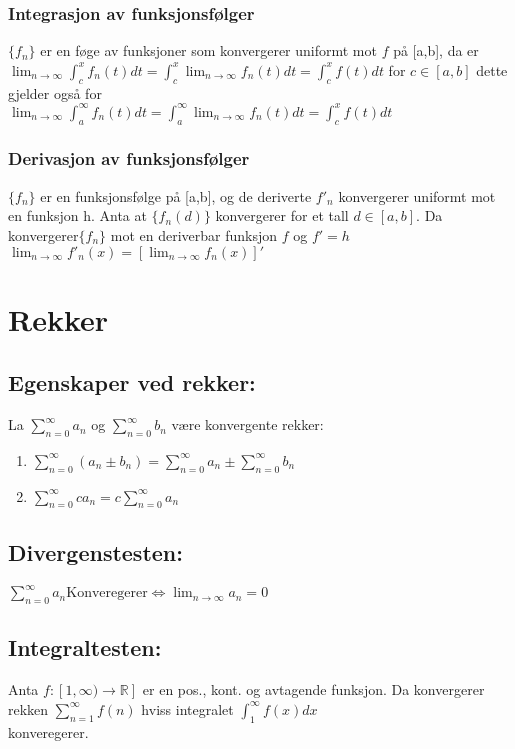\documentclass[8pt,a4paper,twocolumn,twoside]{article}
\def\real{\mathbb{R}}
\begin{document}
            \subsubsection*{Integrasjon av funksjonsfølger}
            $\{f_n\}$ er en føge av funksjoner som konvergerer uniformt mot $f$ på [a,b], da er $\lim_{n\to\infty}\int_c^x f_n(t)dt = \int_c^x\lim_{n\to\infty}f_n(t)dt=\int_c^xf(t)dt$
            for $c \in [a,b]$ dette gjelder også for\\ $\lim_{n\to\infty}\int_a^\infty f_n(t)dt = \int_a^\infty\lim_{n\to\infty}f_n(t)dt=\int_c^xf(t)dt$
            \subsubsection*{Derivasjon av funksjonsfølger}
            $\{f_n\}$ er en funksjonsfølge på [a,b], og de deriverte $f'_n$ konvergerer uniformt mot en funksjon h. Anta 
            at $\{f_n(d)\}$ konvergerer for et tall $d\in [a,b]$. Da konvergerer$\{f_n\}$ mot en deriverbar funksjon $f$ og $f'=h$\\
            $\lim_{n\to\infty}f'_n(x)=[\lim_{n\to\infty}f_n(x)]'$
            
    \section*{Rekker}
        \subsection*{Egenskaper ved rekker:}
        La $\sum_{n=0}^\infty a_n$ og $\sum_{n=0}^\infty b_n$ være konvergente rekker:
        \begin{enumerate}[topsep = 0pt,partopsep = 0pt, itemsep = 0cm]
            \item $\sum_{n=0}^\infty (a_n \pm b_n) = \sum_{n=0}^\infty a_n \pm \sum_{n=0}^\infty b_n$
            \item $\sum_{n=0}^\infty ca_n=c\sum_{n=0}^\infty a_n$
        \end{enumerate}
        \subsection*{Divergenstesten:}
        $\sum_{n=0}^\infty a_n \text{Konveregerer} \Leftrightarrow \lim_{n\to\infty}a_n=0$
        \subsection*{Integraltesten:}
        Anta $f:[1,\infty)\to\real]$ er en pos., kont. og avtagende funksjon. Da konvergerer rekken $\sum_{n=1}^\infty f(n)$ hviss
        integralet $\int_1^\infty f(x)dx$ \\konveregerer.
\end{document}
